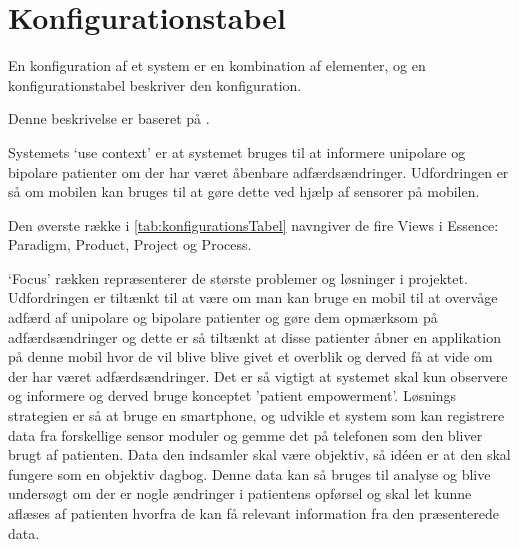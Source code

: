 \section{Konfigurationstabel}
En konfiguration af et system er en kombination af elementer, og en konfigurationstabel beskriver den konfiguration.

Denne beskrivelse er baseret på  \citet[Afsnit 3.2]{art:essence}.

Systemets `use context' er at systemet bruges til at informere unipolare og bipolare patienter om der har været åbenbare adfærdsændringer. Udfordringen er så om mobilen kan bruges til at gøre dette ved hjælp af sensorer på mobilen.

Den øverste række i \cref{tab:konfigurationsTabel} navngiver de fire Views i Essence: Paradigm, Product, Project og Process.

`Focus' rækken repræsenterer de største problemer og løsninger i projektet. 
Udfordringen er tiltænkt til at være om man kan bruge en mobil til at overvåge adfærd af unipolare og bipolare patienter og gøre dem opmærksom på adfærdsændringer og dette er så tiltænkt at disse patienter åbner en applikation på denne mobil hvor de vil blive blive givet et overblik og derved få at vide om der har været adfærdsændringer. 
Det er så vigtigt at systemet skal kun observere og informere og derved bruge konceptet 'patient empowerment'.
Løsnings strategien er så at bruge en smartphone, og udvikle et system som kan registrere data fra forskellige sensor moduler og gemme det på telefonen som den bliver brugt af patienten.
Data den indsamler skal være objektiv, så idéen er at den skal fungere som en objektiv dagbog.
Denne data kan så bruges til analyse og blive undersøgt om der er nogle ændringer i patientens opførsel og skal let kunne aflæses af patienten hvorfra de kan få relevant information fra den præsenterede data. 

